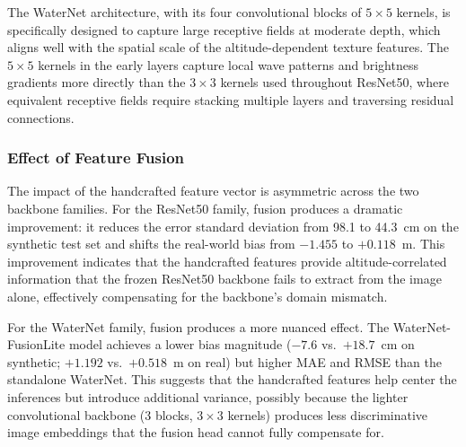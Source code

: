 The WaterNet architecture, with its four convolutional blocks of $5\times5$ kernels, is specifically designed to capture large receptive fields at moderate depth, which aligns well with the spatial scale of the altitude-dependent texture features. The $5\times5$ kernels in the early layers capture local wave patterns and brightness gradients more directly than the $3\times3$ kernels used throughout ResNet50, where equivalent receptive fields require stacking multiple layers and traversing residual connections.

\subsubsection{Effect of Feature Fusion}

The impact of the handcrafted feature vector is asymmetric across the two backbone families. For the ResNet50 family, fusion produces a dramatic improvement: it reduces the error standard deviation from 98.1 to 44.3~cm on the synthetic test set and shifts the real-world bias from $-1.455$ to $+0.118$~m. This improvement indicates that the handcrafted features provide altitude-correlated information that the frozen ResNet50 backbone fails to extract from the image alone, effectively compensating for the backbone's domain mismatch.

For the WaterNet family, fusion produces a more nuanced effect. The WaterNet-FusionLite model achieves a lower bias magnitude ($-7.6$ vs.\ $+18.7$~cm on synthetic; $+1.192$ vs.\ $+0.518$~m on real) but higher MAE and RMSE than the standalone WaterNet. This suggests that the handcrafted features help center the inferences but introduce additional variance, possibly because the lighter convolutional backbone (3 blocks, $3\times3$ kernels) produces less discriminative image embeddings that the fusion head cannot fully compensate for.